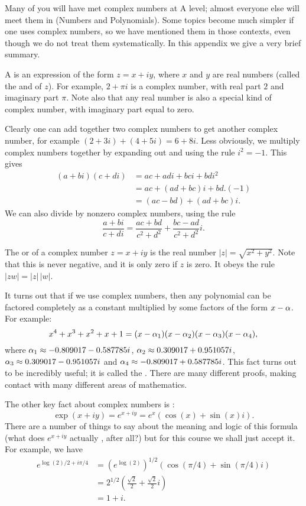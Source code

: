 \documentclass[a4paper]{book}
\theoremstyle{definition}
\begin{document}
Many of you will have met complex numbers at A level; almost everyone
else will meet them in  (Numbers and Polynomials).  Some topics
become much simpler if one uses complex numbers, so we have mentioned
them in those contexts, even though we do not treat them
systematically.  In this appendix we give a very brief summary.

A   is an expression of
the form $z=x+iy$, where $x$ and $y$ are real numbers (called the
 and  of $z$).  For example,
$2+\pi i$ is a complex number, with real part $2$ and imaginary part
$\pi$.  Note also that any real number is also a special kind of
complex number, with imaginary part equal to zero.

Clearly one can add together two complex numbers to get another
complex number, for example $(2+3i)+(4+5i)=6+8i$.  Less obviously, we
multiply complex numbers together by expanding out and using the rule
$i^2=-1$.  This gives
\begin{align*}
 (a+bi)(c+di) &= ac + adi + bci + bdi^2 \\
              &= ac + (ad+bc)i + bd.(-1) \\
              &= (ac-bd) + (ad+bc)i.
\end{align*}
We can also divide by nonzero complex numbers, using the rule
\[ \frac{a+bi}{c+di} = \frac{ac+bd}{c^2+d^2} + \frac{bc-ad}{c^2+d^2}i.
\]

The  or  of a complex number
$z=x+iy$ is the real number $|z|=\sqrt{x^2+y^2}$.  Note that this is
never negative, and it is only zero if $z$ is zero.  It obeys the rule
$|zw|=|z|\,|w|$.

It turns out that if we use complex numbers, then any polynomial can
be factored completely as a constant multiplied by some factors of the
form $x-\alpha$.  For example:
\[ x^4+x^3+x^2+x+1 = (x-\alpha_1)(x-\alpha_2)(x-\alpha_3)(x-\alpha_4), \]
where $\alpha_1\approx -0.809017-0.587785i$,
$\alpha_2\approx 0.309017+0.951057i$, $\alpha_3\approx 0.309017-0.951057i$ and
$\alpha_4\approx -0.809017+0.587785i$.  This fact turns out to be
incredibly useful; it is called the .  There are many different proofs, making contact with many
different areas of mathematics.

The other key fact about complex numbers is 
: 
\[ \exp(x+iy) = e^{x+iy} = e^x(\cos(x) + \sin(x)i). \]
There are a number of things to say about the meaning and logic of
this formula (what does $e^{x+iy}$ actually , after all?)
but for this course we shall just accept it.  For example, we have
\begin{align*}
 e^{\log(2)/2+i\pi/4}
  &= (e^{\log(2)})^{1/2} (\cos(\pi/4)+\sin(\pi/4)i) \\
  &= 2^{1/2}\left( \frac{\sqrt{2}}{2} + \frac{\sqrt{2}}{2} i\right)\\
  &= 1+i.
\end{align*}
 
\end{document}
